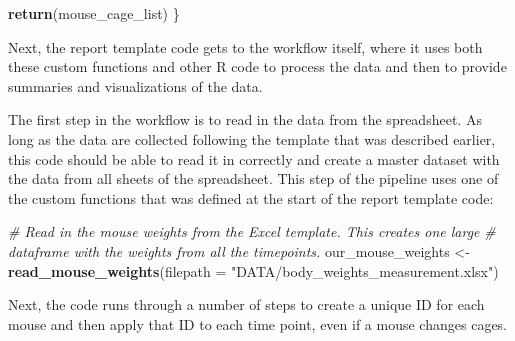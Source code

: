 \documentclass[
]{book}
\newenvironment{Shaded}{\begin{snugshade}}{\end{snugshade}}
\newcommand{\AttributeTok}[1]{\textcolor[rgb]{0.13,0.29,0.53}{#1}}
\newcommand{\CommentTok}[1]{\textcolor[rgb]{0.56,0.35,0.01}{\textit{#1}}}
\newcommand{\FunctionTok}[1]{\textcolor[rgb]{0.13,0.29,0.53}{\textbf{#1}}}
\newcommand{\NormalTok}[1]{#1}
\newcommand{\OtherTok}[1]{\textcolor[rgb]{0.56,0.35,0.01}{#1}}
\newcommand{\StringTok}[1]{\textcolor[rgb]{0.31,0.60,0.02}{#1}}
\begin{document}
\begin{Shaded}
\begin{Highlighting}[]
  \FunctionTok{return}\NormalTok{(mouse\_cage\_list)}
\NormalTok{\}}
\end{Highlighting}
\end{Shaded}

Next, the report template code gets to the workflow itself, where it uses
both these custom functions and other R code to process the data and then
to provide summaries and visualizations of the data.

The first step in the workflow is to read in the data from the spreadsheet.
As long as the data are collected following the template that was described
earlier, this code should be able to read it in correctly and create a
master dataset with the data from all sheets of the spreadsheet. This step
of the pipeline uses one of the custom functions that was defined at the start
of the report template code:

\begin{Shaded}
\begin{Highlighting}[]
\CommentTok{\# Read in the mouse weights from the Excel template. This creates one large}
\CommentTok{\# dataframe with the weights from all the timepoints. }
\NormalTok{our\_mouse\_weights }\OtherTok{\textless{}{-}} \FunctionTok{read\_mouse\_weights}\NormalTok{(}\AttributeTok{filepath =}
                                          \StringTok{"DATA/body\_weights\_measurement.xlsx"}\NormalTok{)}
\end{Highlighting}
\end{Shaded}

Next, the code runs through a number of steps to create a unique ID for
each mouse and then apply that ID to each time point, even if a mouse
changes cages.
\end{document}
